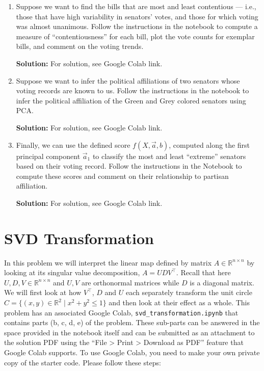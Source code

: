 \documentclass[10pt]{article}
\theoremstyle{definition}
\theoremstyle{plain}
\newcommand{\RR}{\mathbb{R}}
\begin{document}
\begin{enumerate}[label=(\alph*)]
In the Notebook, compute the sum of the variance along $\vec{a}_1$ and $\vec{a}_2$ and plot the data projected on the $\vec{a}_1$--$\vec{a}_2$ plane.

\textbf{Solution:} For solution, see Google Colab link.

\item Suppose we want to find the bills that are most and least contentious --- i.e., those that have high variability in senators' votes, and those for which voting was almost unanimous. Follow the instructions in the notebook to compute a measure of ``contentiousness'' for each bill, plot the vote counts for exemplar bills, and comment on the voting trends.

\textbf{Solution:} For solution, see Google Colab link.

\item Suppose we want to infer the political affiliations of two senators whose voting records are known to us. Follow the instructions in the notebook to infer the political affiliation of the Green and Grey colored senators using PCA.

\textbf{Solution:} For solution, see Google Colab link.

\item Finally, we can use the defined score $f(X, \vec{a}, b)$, computed along the first principal component $\vec{a}_1$ to classify the most and least ``extreme'' senators based on their voting record. Follow the instructions in the Notebook to compute these scores and comment on their relationship to partisan affiliation.

\textbf{Solution:} For solution, see Google Colab link.
\end{enumerate}

\section{SVD Transformation}

In this problem we will interpret the linear map defined by matrix $A \in \RR^{n \times n}$ by looking at its singular value decomposition, $A = UDV^\top$. Recall that here $U, D, V \in \RR^{n \times n}$ and $U, V$ are orthonormal matrices while $D$ is a diagonal matrix. We will first look at how $V^\top$, $D$ and $U$ each separately transform the unit circle $C = \{(x,y) \in \RR^2 \mid x^2 + y^2 \leq 1\}$ and then look at their effect as a whole. This problem has an associated Google Colab, \texttt{svd\_transformation.ipynb} that contains parts (b, c, d, e) of the problem. These sub-parts can be answered in the space provided in the notebook itself and can be submitted as an attachment to the solution PDF using the ``File > Print > Download as PDF'' feature that Google Colab supports. To use Google Colab, you need to make your own private copy of the starter code. Please follow these steps:
\end{document}
